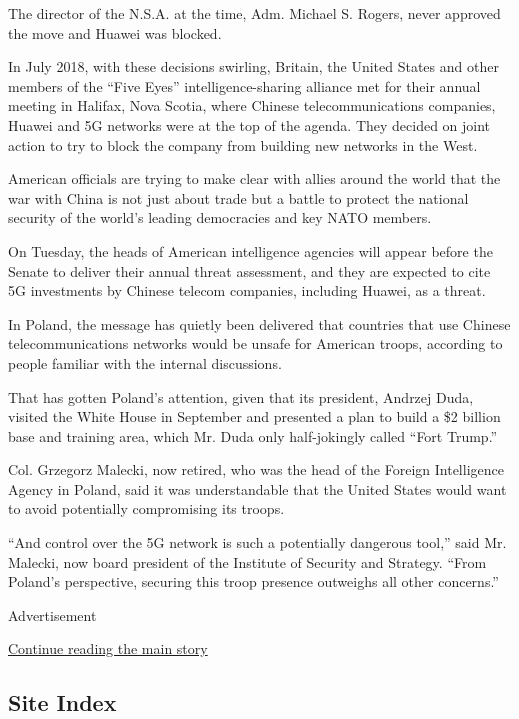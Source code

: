 The director of the N.S.A. at the time, Adm. Michael S. Rogers, never
approved the move and Huawei was blocked.

In July 2018, with these decisions swirling, Britain, the United States
and other members of the ``Five Eyes'' intelligence-sharing alliance met
for their annual meeting in Halifax, Nova Scotia, where Chinese
telecommunications companies, Huawei and 5G networks were at the top of
the agenda. They decided on joint action to try to block the company
from building new networks in the West.

American officials are trying to make clear with allies around the world
that the war with China is not just about trade but a battle to protect
the national security of the world's leading democracies and key NATO
members.

On Tuesday, the heads of American intelligence agencies will appear
before the Senate to deliver their annual threat assessment, and they
are expected to cite 5G investments by Chinese telecom companies,
including Huawei, as a threat.

In Poland, the message has quietly been delivered that countries that
use Chinese telecommunications networks would be unsafe for American
troops, according to people familiar with the internal discussions.

That has gotten Poland's attention, given that its president, Andrzej
Duda, visited the White House in September and presented a plan to build
a \$2 billion base and training area, which Mr. Duda only half-jokingly
called ``Fort Trump.''

Col. Grzegorz Malecki, now retired, who was the head of the Foreign
Intelligence Agency in Poland, said it was understandable that the
United States would want to avoid potentially compromising its troops.

``And control over the 5G network is such a potentially dangerous
tool,'' said Mr. Malecki, now board president of the Institute of
Security and Strategy. ``From Poland's perspective, securing this troop
presence outweighs all other concerns.''

Advertisement

\protect\hyperlink{after-bottom}{Continue reading the main story}

\hypertarget{site-index}{%
\subsection{Site Index}\label{site-index}}

